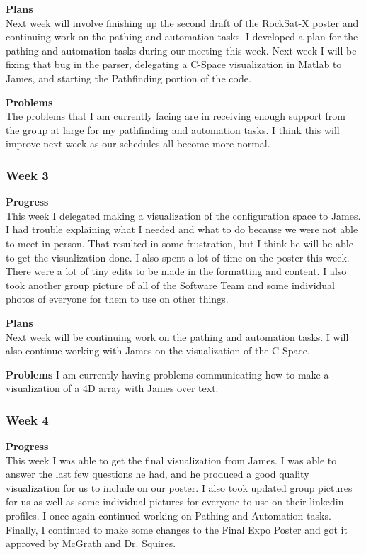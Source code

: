 \textbf{Plans} \\
Next week will involve finishing up the second draft of the RockSat-X poster and continuing work on the pathing and automation tasks. I developed a plan for the pathing and automation tasks during our meeting this week. Next week I will be fixing that bug in the parser, delegating a C-Space visualization in Matlab to James, and starting the Pathfinding portion of the code.

\textbf{Problems} \\
The problems that I am currently facing are in receiving enough support from the group at large for my pathfinding and automation tasks. I think this will improve next week as our schedules all become more normal.


\subsubsection{Week 3}
\textbf{Progress} \\ 
This week I delegated making a visualization of the configuration space to James. I had trouble explaining what I needed and what to do because we were not able to meet in person. That resulted in some frustration, but I think he will be able to get the visualization done. I also spent a lot of time on the poster this week. There were a lot of tiny edits to be made in the formatting and content. I also took another group picture of all of the Software Team and some individual photos of everyone for them to use on other things.

\textbf{Plans} \\ 
Next week will be continuing work on the pathing and automation tasks. I will also continue working with James on the visualization of the C-Space.

\textbf{Problems}
I am currently having problems communicating how to make a visualization of a 4D array with James over text.


\subsubsection{Week 4}
\textbf{Progress} \\ 
This week I was able to get the final visualization from James. I was able to answer the last few questions he had, and he produced a good quality visualization for us to include on our poster. I also took updated group pictures for us as well as some individual pictures for everyone to use on their linkedin profiles. I once again continued working on Pathing and Automation tasks. Finally, I continued to make some changes to the Final Expo Poster and got it approved by McGrath and Dr. Squires.

